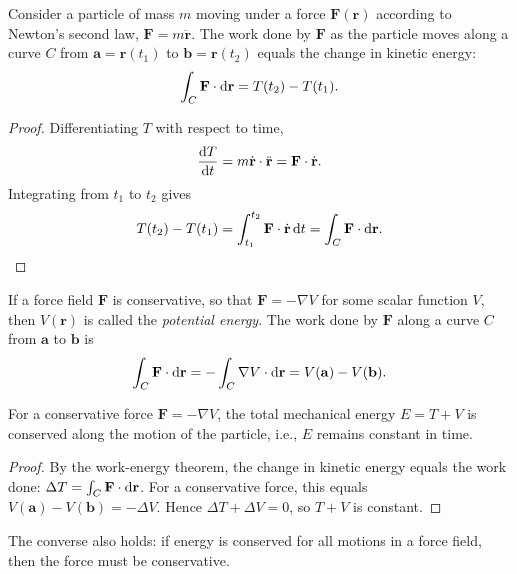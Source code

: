 \documentclass[a4paper]{article}
\begin{document}
\begin{thm}
  Consider a particle of mass $m$ moving under a force $\mathbf{F}(\mathbf{r})$ according to Newton's second law, $\mathbf{F} = m\ddot{\mathbf{r}}$. The work done by $\mathbf{F}$ as the particle moves along a curve $C$ from $\mathbf{a} = \mathbf{r}(t_1)$ to $\mathbf{b} = \mathbf{r}(t_2)$ equals the change in kinetic energy:
  \[
    \int_C \mathbf{F} \cdot \mathrm{d}\mathbf{r} = T(t_2) - T(t_1).
  \]
\end{thm}

\begin{proof}
  Differentiating $T$ with respect to time,
  \[
    \frac{\mathrm{d} T}{\mathrm{d} t} = m\dot{\mathbf{r}} \cdot \ddot{\mathbf{r}} = \mathbf{F} \cdot \dot{\mathbf{r}}.
  \]
  Integrating from $t_1$ to $t_2$ gives
  \[
    T(t_2) - T(t_1) = \int_{t_1}^{t_2} \mathbf{F} \cdot \dot{\mathbf{r}} \, \mathrm{d} t = \int_C \mathbf{F} \cdot \mathrm{d}\mathbf{r}. \qedhere
  \]
\end{proof}

\begin{defi}
  If a force field $\mathbf{F}$ is conservative, so that $\mathbf{F} = -\nabla V$ for some scalar function $V$, then $V(\mathbf{r})$ is called the \emph{potential energy}. The work done by $\mathbf{F}$ along a curve $C$ from $\mathbf{a}$ to $\mathbf{b}$ is
  \[
    \int_C \mathbf{F} \cdot \mathrm{d}\mathbf{r} = -\int_C \nabla V \cdot \mathrm{d}\mathbf{r} = V(\mathbf{a}) - V(\mathbf{b}).
  \]
\end{defi}

\begin{thm}
  For a conservative force $\mathbf{F} = -\nabla V$, the total mechanical energy $E = T + V$ is conserved along the motion of the particle, i.e., $E$ remains constant in time.
\end{thm}

\begin{proof}
  By the work-energy theorem, the change in kinetic energy equals the work done: $\Delta T = \int_C \mathbf{F} \cdot \mathrm{d}\mathbf{r}$. For a conservative force, this equals $V(\mathbf{a}) - V(\mathbf{b}) = -\Delta V$. Hence $\Delta T + \Delta V = 0$, so $T + V$ is constant.
\end{proof}

\begin{rmk}
  The converse also holds: if energy is conserved for all motions in a force field, then the force must be conservative.
\end{rmk}
\end{document}

